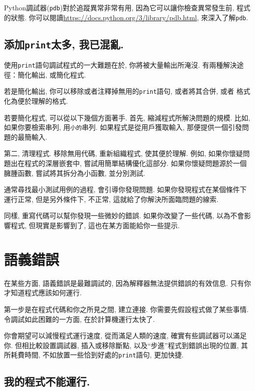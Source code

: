 \documentclass[10pt]{book}
\begin{document}
Python調試器({\tt pdb})對於追蹤異常非常有用, 
因為它可以讓你檢查異常發生前, 程式的狀態. 
你可以閱讀\url{https://docs.python.org/3/library/pdb.html}, 來深入了解{\tt pdb}.


\subsection{添加{\tt print}太多, 我已混亂.}

使用{\tt print}語句調試程式的一大難題在於, 你將被大量輸出所淹沒. 
有兩種解決途徑：簡化輸出, 或簡化程式. 

若是簡化輸出, 你可以移除或者注釋掉無用的{\tt print}語句, 或者將其合併, 或者
格式化為便於理解的格式. 

若要簡化程式, 可以從以下幾個方面著手. 
首先, 縮減程式所解決問題的規模. 
比如, 如果你要檢索串列, 用{\tt 小的}串列. 
如果程式是從用戶獲取輸入, 那便提供一個引發問題的最簡輸入. 

第二, 清理程式. 移除無用代碼, 重新組織程式, 使其便於理解. 
例如, 如果你懷疑問題出在程式的深層嵌套中, 
嘗試用簡單結構優化這部分. 
如果你懷疑問題源於一個臃腫函數, 嘗試將其拆分為小函數, 並分別測試. 

通常尋找最小測試用例的過程, 會引導你發現問題. 
如果你發現程式在某個條件下運行正常, 但是另外條件下, 不正常, 
這就給了你解決所面臨問題的線索. 

同樣, 重寫代碼可以幫你發現一些微妙的錯誤. 
如果你改變了一些代碼, 以為不會影響程式, 但現實是影響到了, 
這也在某方面能給你一些提示. 


\section{語義錯誤}

在某些方面, 語義錯誤是最難調試的, 
因為解釋器無法提供錯誤的有效信息. 
只有你才知道程式應該如何運行. 

第一步是在程式代碼和你之所見之間, 建立連接. 
你需要先假設程式做了某些事情. 
令調試如此困難的一方面, 在於計算機運行太快了. 

你會期望可以減慢程式運行速度, 從而滿足人類的速度, 
確實有些調試器可以滿足你. 
但相比較設置調試器, 插入或移除斷點, 以及``步進''程式到錯誤出現的位置, 其所耗費時間, 
不如放置一些恰到好處的{\tt print}語句, 更加快捷. 

\subsection{我的程式不能運行.}
\end{document}

